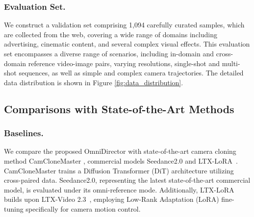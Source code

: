 \documentclass{llmxive}
\begin{document}
\subsubsection{Evaluation Set.} We construct a validation set comprising 1,094 carefully curated samples, which are collected from the web, covering a wide range of domains including advertising, cinematic content, and several complex visual effects. This evaluation set encompasses a diverse range of scenarios, including in-domain and cross-domain reference video-image pairs, varying resolutions, single-shot and multi-shot sequences, as well as simple and complex camera trajectories. The detailed data distribution is shown in Figure \ref{fig:data_distribution}.

\subsection{Comparisons with State-of-the-Art Methods}
\subsubsection{Baselines.} We compare the proposed OmniDirector with state-of-the-art camera cloning method CamCloneMaster \cite{luo2025camclonemaster}, commercial models Seedance2.0 \cite{seedance2026seedance} and LTX-LoRA~\cite{cseti2024ltx23}. CamCloneMaster trains a Diffusion Transformer (DiT) architecture utilizing cross-paired data. Seedance2.0, representing the latest state-of-the-art commercial model, is evaluated under its omni-reference mode. Additionally, LTX-LoRA builds upon LTX-Video 2.3~\cite{hacohen2025ltx2}, employing Low-Rank Adaptation (LoRA) fine-tuning specifically for camera motion control. 
\end{document}
